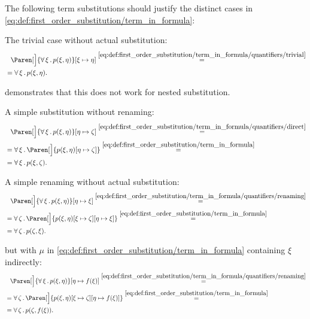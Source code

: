 \begin{example}\label{ex:first_order_substitution}
  The following term substitutions should justify the distinct cases in \eqref{eq:def:first_order_substitution/term_in_formula}:
  \begin{ExEnum}
     The trivial case without actual substitution:
    \begin{align*}
      &{}\phantom{=}{}
      \Paren[\Big]{\Qnt{\forall}{\xi} p(\xi, \eta)}[\xi \mapsto \eta]
      \overset {\eqref{eq:def:first_order_substitution/term_in_formula/quantifiers/trivial}} = \\ &=
      \Qnt{\forall}{\xi} p(\xi, \eta).
    \end{align*}

     demonstrates that this does not work for nested substitution.

     A simple substitution without renaming:
    \begin{align*}
      &{}\phantom{=}{}
      \Paren[\Big]{\Qnt{\forall}{\xi} p(\xi, \eta)}[\eta \mapsto \zeta]
      \overset {\eqref{eq:def:first_order_substitution/term_in_formula/quantifiers/direct}} = \\ &=
      \Qnt{\forall}{\xi} \Paren[\Big]{p(\xi, \eta)[\eta \mapsto \zeta]}
      \overset {\eqref{eq:def:first_order_substitution/term_in_formula}} = \\ &=
      \Qnt{\forall}{\xi} p(\xi, \zeta).
    \end{align*}

     A simple renaming without actual substitution:
    \begin{align*}
      &{}\phantom{=}{}
      \Paren[\Big]{\Qnt{\forall}{\xi} p(\xi, \eta)}[\eta \mapsto \xi]
      \overset {\eqref{eq:def:first_order_substitution/term_in_formula/quantifiers/renaming}} = \\ &=
      \Qnt{\forall}{\zeta} \Paren[\Big]{p(\xi, \eta)[\xi \mapsto \zeta][\eta \mapsto \xi]}
      \overset {\eqref{eq:def:first_order_substitution/term_in_formula}} = \\ &=
      \Qnt{\forall}{\zeta} p(\zeta, \xi).
    \end{align*}

      but with \( \mu \) in \eqref{eq:def:first_order_substitution/term_in_formula} containing \( \xi \) indirectly:
    \begin{align*}
      &{}\phantom{=}{}
      \Paren[\Big]{\Qnt{\forall}{\xi} p(\xi, \eta)}[\eta \mapsto f(\xi)]
      \overset {\eqref{eq:def:first_order_substitution/term_in_formula/quantifiers/renaming}} = \\ &=
      \Qnt{\forall}{\zeta} \Paren[\Big]{p(\xi, \eta)[\xi \mapsto \zeta][\eta \mapsto f(\xi)]}
      \overset {\eqref{eq:def:first_order_substitution/term_in_formula}} = \\ &=
      \Qnt{\forall}{\zeta} p(\zeta, f(\xi)).
    \end{align*}


\end{ExEnum}
\end{example}

